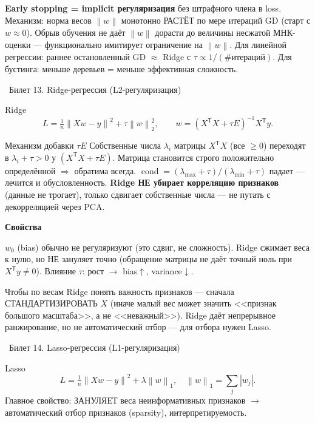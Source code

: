 \documentclass[12pt, a4paper]{article}
\newcommand{\bilet}[2]{%
  \vspace{10pt}%
  \noindent\colorbox{qcolor}{\parbox{\dimexpr\linewidth-2\fboxsep\relax}{%
    \color{white}\large\bfseries\strut\ Билет #1. #2%
  }}%
  \nopagebreak\vspace{5pt}\par\nopagebreak%
}
\newcommand{\qsub}[1]{%
  \vspace{5pt}%
  {\bfseries\color{defblue} #1}%
  \par\vspace{2pt}%
}
\newcommand{\cond}{\operatorname{cond}}
\newcommand{\tr}{^{\mathsf{T}}}
\newcommand{\norm}[1]{\left\lVert #1 \right\rVert}
\begin{document}
\begin{fishkabox}
\textbf{Early stopping = implicit регуляризация} без штрафного члена в loss. Механизм: норма весов $\norm{w}$ монотонно РАСТЁТ по мере итераций GD (старт с $w \approx 0$). Обрыв обучения не даёт $\norm{w}$ дорасти до величины несжатой МНК-оценки --- функционально имитирует ограничение на $\norm{w}$. Для линейной регрессии: раннее остановленный GD $\approx$ Ridge с $\tau \propto 1/(\text{\# итераций})$. Для бустинга: меньше деревьев = меньше эффективная сложность.
\end{fishkabox}

\bilet{13}{Ridge-регрессия (L2-регуляризация)}

\begin{defbox}{Ridge}
\[
  L = \tfrac1n\norm{Xw - y}^2 + \tau\norm{w}_2^2, \qquad w = (X\tr X + \tau E)^{-1}X\tr y.
\]
\end{defbox}

\begin{proofbox}{Механизм добавки $\tau E$}
Собственные числа $\lambda_i$ матрицы $X\tr X$ (все $\ge 0$) переходят в $\lambda_i + \tau > 0$ у $(X\tr X + \tau E)$. Матрица становится строго положительно определённой $\Rightarrow$ обратима всегда. $\cond = (\lambda_{\max}+\tau)/(\lambda_{\min}+\tau)$ падает --- лечится и обусловленность. \textbf{Ridge НЕ убирает корреляцию признаков} (данные не трогает), только сдвигает собственные числа --- не путать с декорреляцией через PCA.
\end{proofbox}

\qsub{Свойства}
$w_0$ (bias) обычно не регуляризуют (это сдвиг, не сложность). Ridge сжимает веса к нулю, но НЕ зануляет точно (обращение матрицы не даёт точный ноль при $X\tr y \ne 0$). Влияние $\tau$: рост $\to$ bias$\uparrow$, variance$\downarrow$.

\begin{fishkabox}
Чтобы по весам Ridge понять важность признаков --- сначала СТАНДАРТИЗИРОВАТЬ $X$ (иначе малый вес может значить <<признак большого масштаба>>, а не <<неважный>>). Ridge даёт непрерывное ранжирование, но не автоматический отбор --- для отбора нужен Lasso.
\end{fishkabox}

\bilet{14}{Lasso-регрессия (L1-регуляризация)}

\begin{defbox}{Lasso}
\[
  L = \tfrac1n\norm{Xw - y}^2 + \lambda\norm{w}_1, \quad \norm{w}_1 = \sum_j |w_j|.
\]
Главное свойство: ЗАНУЛЯЕТ веса неинформативных признаков $\to$ автоматический отбор признаков (sparsity), интерпретируемость.
\end{defbox}
\end{document}
